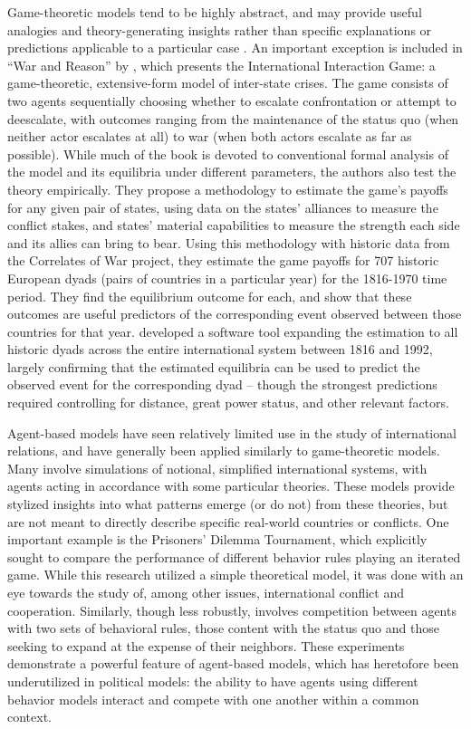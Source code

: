 Game-theoretic models tend to be highly abstract, and may provide useful analogies and theory-generating insights rather than specific explanations or predictions applicable to a particular case \citep{snidal_1985}. An important exception is included in ``War and Reason'' by \citet{bdm_1992}, which presents the International Interaction Game: a game-theoretic, extensive-form model of inter-state crises. The game consists of two agents sequentially choosing whether to escalate confrontation or attempt to deescalate, with outcomes ranging from the maintenance of the status quo (when neither actor escalates at all) to war (when both actors escalate as far as possible). While much of the book is devoted to conventional formal analysis of the model and its equilibria under different parameters, the authors also test the theory empirically. They propose a methodology to estimate the game's payoffs for any given pair of states, using data on the states' alliances to measure the conflict stakes,  and states' material capabilities to measure the strength each side and its allies can bring to bear. Using this methodology with historic data from the Correlates of War project, they estimate the game payoffs for 707 historic European dyads (pairs of countries in a particular year) for the 1816-1970 time period. They find the equilibrium outcome for each, and show that these outcomes are useful predictors of the corresponding event observed between those countries for that year. \citet{bennett_2000b} developed a software tool expanding the estimation to all historic dyads across the entire international system between 1816 and 1992, largely confirming that the estimated equilibria can be used to predict the observed event for the corresponding dyad -- though the strongest predictions required controlling for distance, great power status, and other relevant factors.

Agent-based models have seen relatively limited use in the study of international relations, and have generally been applied similarly to game-theoretic models. Many \citep[e.g.][]{cederman_1997,axelrod_1997,min_2002} involve simulations of notional, simplified international systems, with agents acting in accordance with some particular theories. These models provide stylized insights into what patterns emerge (or do not) from these theories, but are not meant to directly describe specific real-world countries or conflicts. One important example is the \citet{axelrod_1980} Prisoners' Dilemma Tournament, which explicitly sought to compare the performance of different behavior rules playing an iterated game. While this research utilized a simple theoretical model, it was done with an eye towards the study of, among other issues, international conflict and cooperation. Similarly, though less robustly, \citet{cederman_1997} involves competition between agents with two sets of behavioral rules, those content with the status quo and those seeking to expand at the expense of their neighbors. These experiments demonstrate a powerful feature of agent-based models, which has heretofore been underutilized in political models: the ability to have agents using different behavior models interact and compete with one another within a common context.

